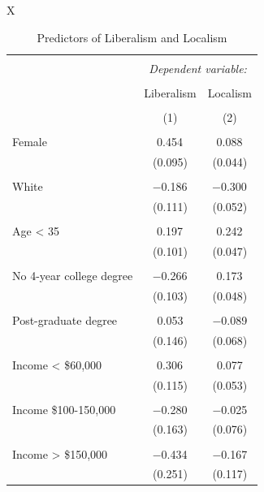 \documentclass[article,11pt]{memoir}
\begin{document}

\begin{table}
  \caption{Predictors of Liberalism and Localism}
  \label{tab:e_lib_loc_regression}
  \begin{threeparttable}
  \footnotesize
  \begin{tabularx}{\linewidth}{X}
  \centering

  \begin{tabular}{@{\extracolsep{5pt}}lcc} 
  \\[-1.8ex]\hline 
  \hline \\[-1.8ex] 
   & \multicolumn{2}{c}{\textit{Dependent variable:}} \\ 
  \cline{2-3} 
  \\[-1.8ex] & Liberalism & Localism \\ 
  \\[-1.8ex] & (1) & (2)\\ 
  \hline \\[-1.8ex] 
   Female & 0.454$^{}$ & 0.088$^{}$ \\ 
    & (0.095) & (0.044) \\ 
    & & \\ 
   White & $-$0.186$^{}$ & $-$0.300$^{}$ \\ 
    & (0.111) & (0.052) \\ 
    & & \\ 
   Age < 35 & 0.197$^{}$ & 0.242$^{}$ \\ 
    & (0.101) & (0.047) \\ 
    & & \\ 
   No 4-year college degree & $-$0.266$^{}$ & 0.173$^{}$ \\ 
    & (0.103) & (0.048) \\ 
    & & \\ 
   Post-graduate degree & 0.053 & $-$0.089 \\ 
    & (0.146) & (0.068) \\ 
    & & \\ 
   Income < \$60,000 & 0.306$^{}$ & 0.077 \\ 
    & (0.115) & (0.053) \\ 
    & & \\ 
   Income \$100-150,000 & $-$0.280$^{}$ & $-$0.025 \\ 
    & (0.163) & (0.076) \\ 
    & & \\ 
   Income > \$150,000 & $-$0.434$^{}$ & $-$0.167 \\ 
    & (0.251) & (0.117) \\ 

\end{tabular}
\end{tabularx}
\end{threeparttable}
\end{table}
\end{document}
